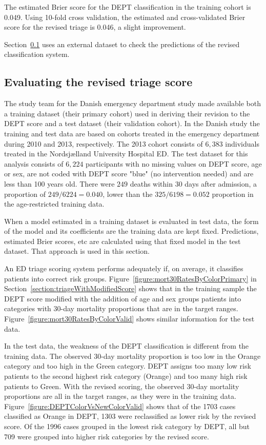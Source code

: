 The estimated Brier score for the DEPT classification in the training cohort is 0.049. Using 10-fold cross validation, the estimated and cross-validated Brier score for the revised triage is 0.046, a slight improvement.

Section~\ref{section:validationRevisedTriageScore} uses an external dataset to check the predictions of the revised classification system.


\subsection{Evaluating the revised triage score}
\label{section:validationRevisedTriageScore}

The study team for the Danish emergency department study made available both a training dataset (their primary cohort) used in deriving their revision to the DEPT score and a test dataset (their validation cohort).  In the Danish study the training and test data are based on cohorts treated in the emergency department during 2010 and 2013, respectively.  The 2013 cohort consists of $6,383$ individuals treated in the Nordsj{\ae}lland University Hospital ED.  The test dataset for this analysis consists of $6,224$ participants with no missing values on DEPT score, age or sex, are not coded with DEPT score "blue" (no intervention needed) and are less than 100 years old.   There were $249$ deaths within 30 days after admission, a proportion of $249/6224 = 0.040$, lower than the $325/6198 = 0.052$ proportion in the age-restricted training data. 

When a model estimated in a training dataset is evaluated in test data, the form of the model and its coefficients are the training data are kept fixed.  Predictions, estimated Brier scores, etc are calculated using that fixed model in the test dataset.  That approach is used in this section.

An ED triage scoring system performs adequately if, on average, it classifies patients into correct risk groups.  Figure~\ref{figure:mort30RatesByColorPrimary} in Section~\ref{section:triageWithModifiedScore} shows that in the training sample the DEPT score modified with the addition of age and sex groups patients into categories with 30-day mortality proportions that are in the target ranges.  Figure~\ref{figure:mort30RatesByColorValid} shows similar information for the test data.

In the test data, the weakness of the DEPT classification is different from the training data.  The observed 30-day mortality proportion is too low in the Orange category and too high in the Green category. DEPT assigns too many low risk patients to the second highest risk category (Orange) and too many high risk patients to Green.  With the revised scoring, the observed 30-day mortality proportions are all in the target ranges, as they were in the training data.  Figure~\ref{figure:DEPTColorVsNewColorValid} shows that of the 1703 cases classified as Orange in DEPT, 1303 were reclassified as lower risk by the revised score.  Of the 1996 cases grouped in the lowest risk category by DEPT, all but 709 were grouped into higher risk categories by the revised score.

